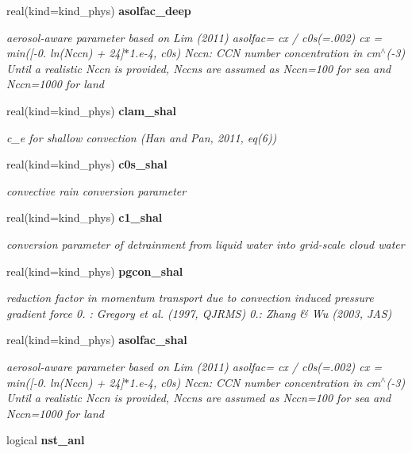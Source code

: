 \begin{DoxyCompactItemize}
real(kind=kind\+\_\+phys) \textbf{ asolfac\+\_\+deep}
\begin{DoxyCompactList}\small\item\em aerosol-\/aware parameter based on Lim (2011) asolfac= cx / c0s(=.002) cx = min([-\/0. ln(\+Nccn) + 24]$\ast$1.e-\/4, c0s) Nccn\+: C\+CN number concentration in cm$^\wedge$(-\/3) Until a realistic Nccn is provided, Nccns are assumed as Nccn=100 for sea and Nccn=1000 for land \end{DoxyCompactList}\item 
real(kind=kind\+\_\+phys) \textbf{ clam\+\_\+shal}
\begin{DoxyCompactList}\small\item\em c\+\_\+e for shallow convection (Han and Pan, 2011, eq(6)) \end{DoxyCompactList}\item 
real(kind=kind\+\_\+phys) \textbf{ c0s\+\_\+shal}
\begin{DoxyCompactList}\small\item\em convective rain conversion parameter \end{DoxyCompactList}\item 
real(kind=kind\+\_\+phys) \textbf{ c1\+\_\+shal}
\begin{DoxyCompactList}\small\item\em conversion parameter of detrainment from liquid water into grid-\/scale cloud water \end{DoxyCompactList}\item 
real(kind=kind\+\_\+phys) \textbf{ pgcon\+\_\+shal}
\begin{DoxyCompactList}\small\item\em reduction factor in momentum transport due to convection induced pressure gradient force 0. \+: Gregory et al. (1997, Q\+J\+R\+MS) 0.\+: Zhang \& Wu (2003, J\+AS) \end{DoxyCompactList}\item 
real(kind=kind\+\_\+phys) \textbf{ asolfac\+\_\+shal}
\begin{DoxyCompactList}\small\item\em aerosol-\/aware parameter based on Lim (2011) asolfac= cx / c0s(=.002) cx = min([-\/0. ln(\+Nccn) + 24]$\ast$1.e-\/4, c0s) Nccn\+: C\+CN number concentration in cm$^\wedge$(-\/3) Until a realistic Nccn is provided, Nccns are assumed as Nccn=100 for sea and Nccn=1000 for land \end{DoxyCompactList}\item 
logical \textbf{ nst\+\_\+anl}

\end{DoxyCompactItemize}
